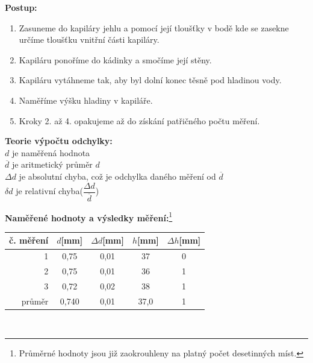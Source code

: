 \documentclass[12pt, a4paper]{article}
\begin{document}
\tab \textbf{Postup: }
\begin{enumerate}
    \item Zasuneme do kapiláry jehlu a pomocí její tloušťky v bodě kde se zasekne určíme tloušťku vnitřní části kapiláry.
    \item Kapiláru ponoříme do kádinky a smočíme její stěny.
    \item Kapiláru vytáhneme tak, aby byl dolní konec těsně pod hladinou vody.
    \item Naměříme výšku hladiny v kapiláře.
    \item Kroky 2. až 4. opakujeme až do získání patřičného počtu měření.
\end{enumerate} \par
\pagebreak
\tab \textbf{Teorie výpočtu odchylky:}\\
{
    \hspace{1.4em}
    $d$ je naměřená hodnota\\
    $\overline{d}$ je aritmetický průměr $d$\\
    $\Delta d$ je absolutní chyba, což je odchylka daného měření od $\overline{d}$\\
    $\delta d$ je relativní chyba($\dfrac{\Delta d}{\overline{d}}$)
} 

\tab \textbf{Naměřené hodnoty a výsledky měření:}\footnote{Průměrné hodnoty jsou již zaokrouhleny na platný počet desetinných míst.}\\[6pt]
\begin{tabular}{r|c c|c c}
    {č. měření} & {$d$[mm]} & {$\Delta d$[mm]} & {$h$[mm]} & {$\Delta h$[mm]}\\
    \hline
    1 & 0,75 & 0,01 & 37 & 0\\
    2 & 0,75 & 0,01 & 36 & 1\\
    3 & 0,72 & 0,02 & 38 & 1\\
    \hline
    {průměr} & 0,740 & 0,01 & 37,0 & 1
\end{tabular}\\[20pt]
\end{document}
